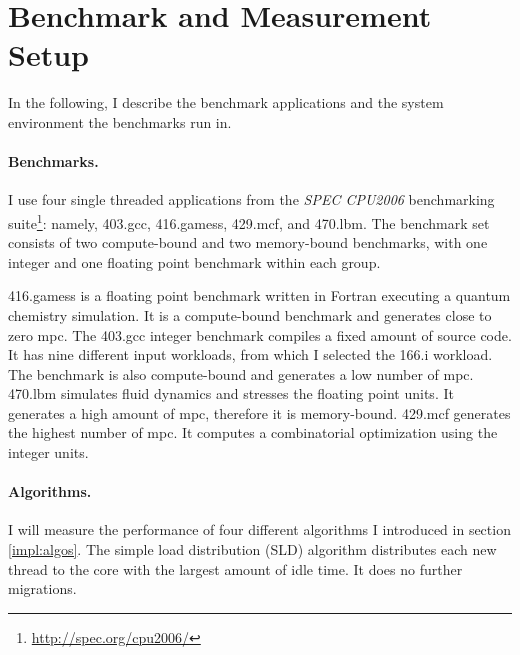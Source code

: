 \section{Benchmark and Measurement Setup}

In the following, I describe the benchmark applications and the
system environment the benchmarks run in.

\paragraph{Benchmarks.}
I use four single threaded applications from the \emph{SPEC CPU2006} benchmarking
suite\footnote{\url{http://spec.org/cpu2006/}}:
namely, 403.gcc, 416.gamess, 429.mcf, and 470.lbm.
The benchmark set consists of two compute-bound and two memory-bound
benchmarks, with one integer and one floating point benchmark within each group.

416.gamess is a floating point benchmark written in Fortran executing a quantum
chemistry simulation.
It is a compute-bound benchmark and generates close to zero \gls{mpc}.
The 403.gcc integer benchmark compiles a fixed amount of source code.
It has nine different input workloads, from which I selected the 166.i
workload.
The benchmark is also compute-bound and generates a low number of \gls{mpc}.
470.lbm simulates fluid dynamics and stresses the floating point units.
It generates a high amount of \gls{mpc}, therefore it is memory-bound.
429.mcf generates the highest number of \gls{mpc}.
It computes a combinatorial optimization using the integer units.

\begin{comment}
Besides the SPEC benchmarks, I employ two other applications to prove the
group configuration awareness of the load balancer one the one side, and the
performance benefits for such a configuration on the other side.
To that end, I use a multi-threaded matrix multiplication for a matrix with
one thousand entries and a client-server application printing the number of the
core it currently runs on.

The latter benchmark shows that client and server are migrated together, as
long as there is only one client per task.
If a task spawns several threads, the balancer distributes the additional
threads to other cores.
\end{comment}


\paragraph{Algorithms.}
I will measure the performance of four different algorithms I introduced in
section \ref{impl:algos}.
The simple load distribution (SLD) algorithm distributes each new thread to the
core with the largest amount of idle time.
It does no further migrations.

